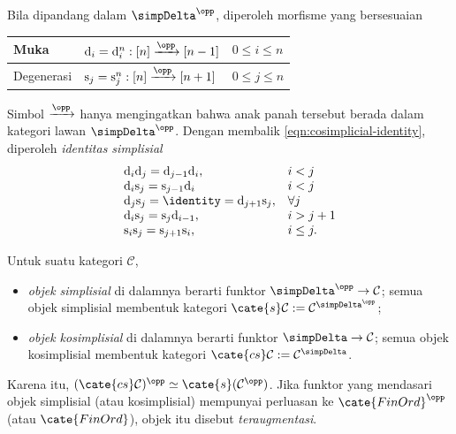 Bila dipandang dalam $\simpDelta^{\opp}$, diperoleh morfisme yang bersesuaian
\begin{center}\begin{tabular}{|l|l|l|} \hline
		Muka & $\mathrm{d}_i = \mathrm{d}^n_i: [n] \xrightarrow{\opp} [n-1]$ & $0 \leq i \leq n$ \\ \hline
		Degenerasi & $\mathrm{s}_j = \mathrm{s}^n_j: [n] \xrightarrow{\opp} [n+1]$ & $0 \leq j \leq n$ \\ \hline
\end{tabular}\end{center}
Simbol $\xrightarrow{\opp}$ hanya mengingatkan bahwa anak panah tersebut
berada dalam kategori lawan $\simpDelta^{\opp}$. Dengan membalik
\eqref{eqn:cosimplicial-identity}, diperoleh \emph{identitas simplisial}
\begin{equation}\label{eqn:simplicial-identity}\begin{array}{ll}
	\mathrm{d}_i \mathrm{d}_j = \mathrm{d}_{j-1} \mathrm{d}_i, & i < j \\
	\mathrm{d}_i \mathrm{s}_j = \mathrm{s}_{j-1} \mathrm{d}_i & i < j \\
	\mathrm{d}_j \mathrm{s}_j = \identity = \mathrm{d}_{j+1} \mathrm{s}_j, & \forall j \\
	\mathrm{d}_i \mathrm{s}_j  = \mathrm{s}_j \mathrm{d}_{i-1}, & i > j+1 \\
	\mathrm{s}_i \mathrm{s}_j = \mathrm{s}_{j+1} \mathrm{s}_i, & i \leq j.
\end{array}\end{equation}

\begin{definition}\label{def:simplicial-obj}
	Untuk suatu kategori $\mathcal{C}$,
	\begin{itemize}
		\item \emph{objek simplisial} di dalamnya berarti funktor
		$\simpDelta^{\opp}\to\mathcal{C}$; semua objek simplisial membentuk
		kategori
		$\cate{s}\mathcal{C}:=\mathcal{C}^{\simpDelta^{\opp}}$;
		\item \emph{objek kosimplisial} di dalamnya berarti funktor
		$\simpDelta\to\mathcal{C}$; semua objek kosimplisial membentuk kategori
		$\cate{cs}\mathcal{C}:=\mathcal{C}^{\simpDelta}$.
	\end{itemize}

	Karena itu,
	$(\cate{cs}\mathcal{C})^{\opp}\simeq\cate{s}(\mathcal{C}^{\opp})$.
	Jika funktor yang mendasari objek simplisial (atau kosimplisial) mempunyai perluasan ke
	$\cate{FinOrd}^{\opp}$ (atau $\cate{FinOrd}$), objek itu disebut
	\emph{teraugmentasi}.
\end{definition}

